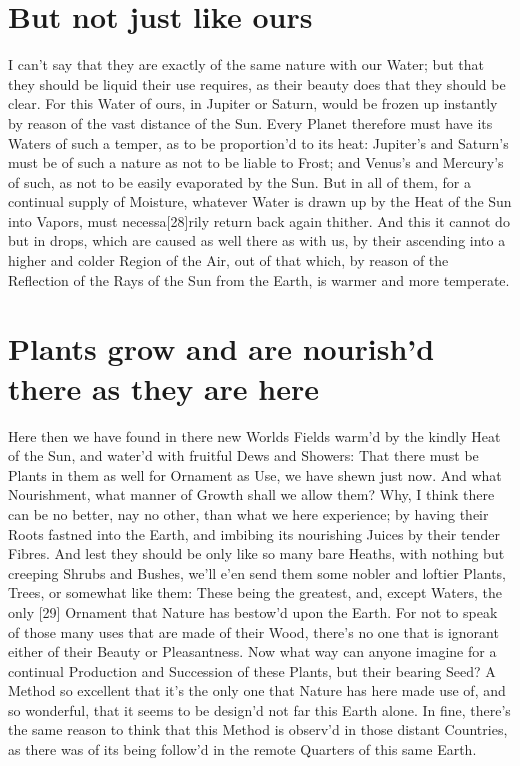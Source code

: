 \documentclass[letterpaper]{book}
\begin{document}
\section{But not just like ours}

I can't say that they are exactly of the same nature with our Water; but
that they should be liquid their use requires, as their beauty does that they
should be clear. For this Water of ours, in Jupiter or Saturn, would be
frozen up instantly by reason of the vast distance of the Sun. Every Planet
therefore must have its Waters of such a temper, as to be proportion'd to
its heat: Jupiter's and Saturn's must be of such a nature as not to be liable
to Frost; and Venus's and Mercury's of such, as not to be easily evaporated
by the Sun. But in all of them, for a continual supply of Moisture, whatever
Water is drawn up by the Heat of the Sun into Vapors, must necessa[28]rily
return back again thither. And this it cannot do but in drops, which are
caused as well there as with us, by their ascending into a higher and colder
Region of the Air, out of that which, by reason of the Reflection of the Rays
of the Sun from the Earth, is warmer and more temperate.


\section{Plants grow and are nourish'd there as they are here}

Here then we have found in there new Worlds Fields warm'd by the kindly Heat
of the Sun, and water'd with fruitful Dews and Showers: That there must be
Plants in them as well for Ornament as Use, we have shewn just now. And what
Nourishment, what manner of Growth shall we allow them?  Why, I think there
can be no better, nay no other, than what we here experience; by having
their Roots fastned into the Earth, and imbibing its nourishing Juices by
their tender Fibres. And lest they should be only like so many bare Heaths,
with nothing but creeping Shrubs and Bushes, we'll e'en send them some
nobler and loftier Plants, Trees, or somewhat like them: These being the
greatest, and, except Waters, the only [29] Ornament that Nature has
bestow'd upon the Earth. For not to speak of those many uses that are made
of their Wood, there's no one that is ignorant either of their Beauty or
Pleasantness. Now what way can anyone imagine for a continual Production and
Succession of these Plants, but their bearing Seed? A Method so excellent
that it's the only one that Nature has here made use of, and so wonderful,
that it seems to be design'd not far this Earth alone. In fine, there's the
same reason to think that this Method is observ'd in those distant
Countries, as there was of its being follow'd in the remote Quarters of this
same Earth.
\end{document}
